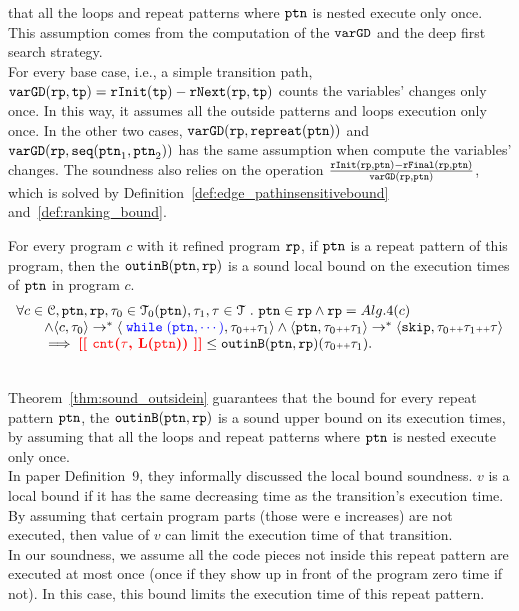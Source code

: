 that all the loops and repeat patterns where $\mathtt{ptn}$ is nested execute only once.
This assumption comes from the computation of the $\mathtt{varGD}$ and the deep first search strategy.
\\
For every base case, i.e., a simple transition path, 
$\mathtt{varGD}(\mathtt{rp}, \mathtt{tp}) =  \mathtt{rInit}(\mathtt{tp}) - \mathtt{rNext}(\mathtt{rp}, \mathtt{tp})$
counts the variables' changes only once. In this way, it assumes all the outside patterns and loops execution only once.
In the other two cases,  $\mathtt{varGD}(\mathtt{rp}, \mathtt{repreat}(\mathtt{ptn}))$ and $\mathtt{varGD}(\mathtt{rp}, \mathtt{seq}(\mathtt{ptn}_1, \mathtt{ptn}_2))$
has the same assumption when compute the variables' changes.
The soundness also relies on the operation $\frac{\mathtt{rInit}(\mathtt{rp}, \mathtt{ptn}) - \mathtt{rFinal}(\mathtt{rp}, \mathtt{ptn})}{\mathtt{varGD}(\mathtt{rp}, \mathtt{ptn})}$,
which is solved by Definition~\ref{def:edge_pathinsensitivebound} and~\ref{def:ranking_bound}.
%
\begin{thm}
  \label{thm:sound_outsidein}
  For every program $c$ with it refined program $\mathtt{rp}$,
  if $\mathtt{ptn}$ is a repeat pattern of this program, then the $\mathtt{outinB}(\mathtt{ptn}, \mathtt{rp})$
is a sound local bound on the execution times of $\mathtt{ptn}$ in program $c$.
  \[
    \begin{array}{l}
    \forall c \in \cdom, \rpattern, \rprog, \trace_0 \in \mathcal{T}_0(\rpattern), \trace_1, \trace \in \mathcal{T} \st 
    \rpattern \in \rprog \land
    \rprog = Alg.4(c)
    \\ \qquad
    \land
    \config{c, \trace_0} \to^* \config{\highlight{\ewhile (\rpattern, \cdots)}, \trace_0 \tracecat \trace_1} 
    \land 
    \config{\rpattern, \trace_0 \tracecat \trace_1} \to^* \config{{\eskip, \trace_0 \tracecat \trace_1 \tracecat \trace}}
    \\ \qquad
    \implies
    \todo{\vcounter(\trace, L(\rpattern))} \leq \outinB(\rpattern, \rprog)(\trace_0 \tracecat \trace_1).
    \end{array}
    \]
\end{thm}
\\
Theorem~\ref{thm:sound_outsidein} guarantees that
the bound for every repeat pattern $\mathtt{ptn}$, the $\mathtt{outinB}(\mathtt{ptn}, \mathtt{rp})$
is a sound upper bound on its execution times, by assuming
that all the loops and repeat patterns where $\mathtt{ptn}$ is nested execute only once.
\\
In paper \cite{sinn2017complexity} Definition~9, they informally discussed the local bound soundness.
$v$ is a local bound if it has the same decreasing time as the transition's execution time.
By assuming that certain program parts (those were e increases) are not executed,
then value of $v$ can limit the execution time of that transition.
\\
In our soundness, we assume all the code pieces not inside this repeat pattern are executed at most once (once if they show up in front of the program
zero time if not).
In this case, this bound limits the execution time of this repeat pattern.
%
